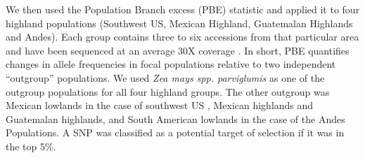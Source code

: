 \documentclass[9pt,twocolumn,twoside,lineno]{gsajnl}
\begin{document}
We then used the Population Branch excess (PBE) statistic \cite{Pool2017-oa} and applied it to four highland populations (Southwest US, Mexican Highland, Guatemalan Highlands and Andes). 
Each group contains three to six accessions from that particular area and have been sequenced at an average 30X coverage \cite{Wang2017-bc}. 
In short, PBE quantifies changes in allele frequencies in focal populations relative to two independent “outgroup” populations. We used \textit{Zea mays spp. parviglumis} as one of the outgroup populations for all four highland groups. 
The other outgroup was  Mexican lowlands  in the case of southwest US , Mexican highlands and Guatemalan highlands, and South American lowlands in the case of the Andes Populations. A SNP was classified as a potential target of selection if it was in the top 5\%. 
\end{document}
